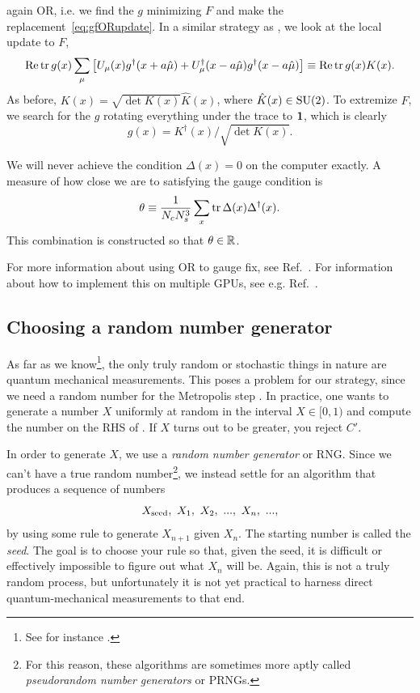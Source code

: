 again OR, i.e. we find the $g$ minimizing $F$ and make the
replacement~\eqref{eq:gfORupdate}. In a similar strategy as
, we look at the local update to $F$,
\begin{equation}
  \mathop{\mathrm{Re}}\tr g(x)\sum_\mu\left[U_\mu(x)g^\dagger(x+a\hat\mu)
                        +U_\mu^\dagger(x-a\hat\mu)g^\dagger(x-a\hat\mu)\right]
  \equiv\mathop{\mathrm{Re}}\tr g(x)K(x).
\end{equation}
As before, $K(x)=\sqrt{\det K(x)}\hat K(x)$, where $\hat K(x)\in\operatorname{SU}(2)$.
To extremize $F$, we search for the $g$ rotating everything under the
trace to ${\mathbf 1}$, which is clearly
\begin{equation}
  g(x)=K^\dagger(x)/\sqrt{\det K(x)}.
\end{equation} 

We will never achieve the condition $\Delta(x)=0$ on the computer exactly.
A measure of how close we are to satisfying the gauge condition is
\begin{equation}
  \theta\equiv\frac{1}{N_c N_s^3}\sum_x\tr\Delta(x)\Delta^\dagger(x).
\end{equation}
This combination is constructed so that $\theta\in\mathbb{R}$. 

For more information
about using OR to gauge fix, see Ref.~\cite{mandula_efficient_1990}. 
For information about how to implement this on multiple GPUs, see
e.g. Ref.~\cite{schrock_coulomb_2013}.

\subsection{Choosing a random number generator}

As far as we know\footnote{See for instance .}, 
the only truly random or stochastic things in nature are
quantum mechanical measurements. This poses a problem for our strategy, since
we need a random number for the Metropolis step .
In practice, one wants to generate a number $X$ uniformly at random
in the interval $X\in[0,1)$ and compute the number on the RHS
of . If $X$ turns out to be greater, you reject $C'$.

In order to generate $X$, we use a {\it random number
generator} or RNG. 
Since we can't have a true random number\footnote{For
this reason, these algorithms are sometimes more aptly called
{\it pseudorandom number generators}
or PRNGs.}, we instead settle for an algorithm that produces a sequence of numbers
\begin{equation}
  X_{\rm seed},~X_1,~X_2,~...,~X_n,~...,
\end{equation}
by using some rule to generate $X_{n+1}$ given $X_n$. The starting number is
called the {\it seed}. The goal is to choose your rule so that,
given the seed, it is difficult or effectively impossible to figure out what
$X_n$ will be. Again, this is not a truly random process, but unfortunately it
is not yet practical to harness direct quantum-mechanical measurements to that
end. 

